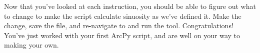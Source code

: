 \documentclass{article}
\begin{document}
Now that you've looked at each instruction, you should be able to figure out what to change to make the script calculate sinuosity as we've defined it.  Make the change, save the file, and re-navigate to and run the tool.
Congratulations!  You've just worked with your first ArcPy script, and are well on your way to making your own.
\end{document}
